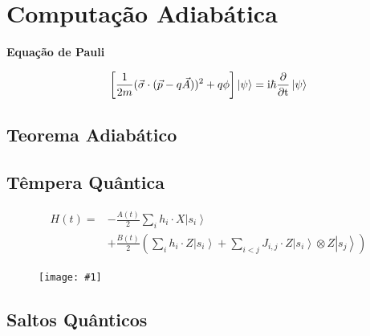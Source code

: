 \documentclass[t]{beamer}
\newcommand{\ii}{
	\rm{i}
}
\newcommand{\titulo}[1]{%
	\textbf{\Large #1\\}
}
\newcommand{\ket}[1]{\ensuremath{\left|#1\right\rangle}}
\newcommand{\imgw}[2]{%
\begin{center}
	\begin{figure}
	\texttt{[image: \#1]}\\
	\end{figure}
\end{center}
}
\begin{document}
	\begin{frame}{\subsecname}
	
	\end{frame}	
	
	\begin{frame}{\subsecname}
	
	\end{frame}
	
	\section{Computação Adiabática}
	
	\begin{frame}{\secname}
	\titulo{Equação de Pauli}
	$$\left[{\frac {1}{2m}}({\vec {\sigma }}\cdot ({\vec {p}}-q{\vec {A}}))^{2}+q\phi \right]\ket{\psi} = \ii\hbar {\frac {\partial }{\partial t}}\ket{\psi}$$
	
	\end{frame}
	
	\subsection{Teorema Adiabático}
	
	\subsection{Têmpera Quântica}	
	
	\begin{frame}{\subsecname}
		\begin{align*}
			H(t) = &-\frac{A(t)}{2}  \sum_{i} h_i \cdot X\ket{s_i}\\ &+ \frac{B(t)}{2}\left(\sum_{i} h_i \cdot Z\ket{s_i} + \sum_{i < j} J_{i,j} \cdot Z\ket{s_i} \otimes Z\ket{s_j}\right)
		\end{align*}
	\end{frame}
	
	\begin{frame}{\subsecname}
		\imgw{energy-levels.pdf}{7cm}
	\end{frame}
	
	\subsection{Saltos Quânticos}
	
	\begin{frame}
	
	\end{frame}	
	
\end{document}
